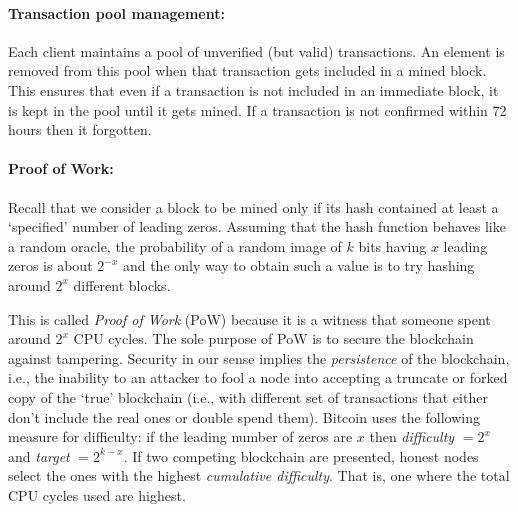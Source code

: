 \documentclass[]{report}   %
\begin{document}
\paragraph{Transaction pool management:} Each client maintains a pool of unverified (but valid) transactions. An element is removed from this pool when that transaction gets included in a mined block. This ensures that even if a transaction is not included in an immediate block, it is kept in the pool until it gets mined. If a transaction is not confirmed within 72 hours then it forgotten. 

\paragraph{Proof of Work:} Recall that we consider a block to be mined only if its hash contained at least a `specified' number of leading zeros. Assuming that the hash function behaves like a random oracle, the probability of a random image of $k$ bits having $x$ leading zeros is about $2^{-x}$ and the only way to obtain such a value is to try hashing around $2^x$ different blocks.

This is called {\em Proof of Work} (PoW) because it is a witness that someone spent around $2^x$ CPU cycles. The sole purpose of PoW is to secure the blockchain against tampering. 
Security in our sense implies the {\em persistence} of the blockchain, i.e., the inability to an attacker to fool a node into accepting a truncate or forked copy of the `true' blockchain (i.e., with different set of transactions that either don't include the real ones or double spend them). Bitcoin uses the following measure for difficulty: if the leading number of zeros are $x$ then {\em difficulty} $=2^{x}$ and {\em target} $=2^{k-x}$. 
If two competing blockchain are presented, honest nodes select the ones with the highest {\em cumulative difficulty}. That is, one where the total CPU cycles used are highest. 




\end{document}
